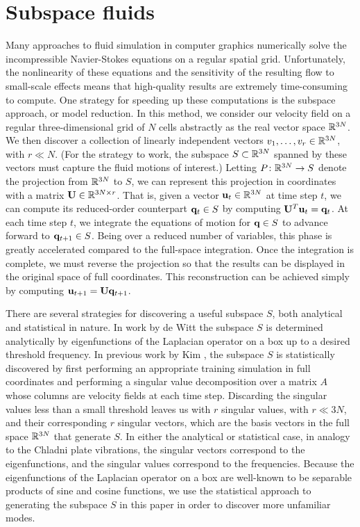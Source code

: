 \documentclass[11pt]{article}
\begin{document}
\section*{Subspace fluids}
Many approaches to fluid simulation in computer graphics numerically solve the incompressible Navier-Stokes equations on a regular spatial grid. Unfortunately, the nonlinearity of these equations and the sensitivity of the resulting flow to small-scale effects means that high-quality results are extremely time-consuming to compute. One strategy for speeding up these computations is the subspace approach, or model reduction. In this method, we consider our velocity field on a regular three-dimensional grid of $N$ cells abstractly as the real vector space $\mathbb{R}^{3N}$. We then discover a collection of linearly independent vectors $v_1, \ldots, v_r \in \mathbb{R}^{3N}$, with $r \ll N$. (For the strategy to work, the subspace $S \subset \mathbb{R}^{3N}$ spanned by these vectors must capture the fluid motions of interest.) Letting $P \colon \mathbb{R}^{3N} \rightarrow S$ denote the projection from $\mathbb{R}^{3N}$ to $S$, we can represent this projection in coordinates with a matrix $\mathbf{U} \in \mathbb{R}^{3N \times r}$. That is, given a vector $\mathbf{u}_t \in \mathbb{R}^{3N}$ at time step $t$, we can compute its reduced-order counterpart $\mathbf{q}_t \in S$ by computing $\mathbf{U}^T \mathbf{u}_t = \mathbf{q}_t$. At each time step $t$, we integrate the equations of motion for $\mathbf{q} \in S$ to advance forward to $\mathbf{q}_{t+1} \in S$. Being over a reduced number of variables, this phase is greatly accelerated compared to the full-space integration. Once the integration is complete, we must reverse the projection so that the results can be displayed in the original space of full coordinates. This reconstruction can be achieved simply by computing $\mathbf{u}_{t+1} = \mathbf{U}\mathbf{q}_{t+1}$.

There are several strategies for discovering a useful subspace $S$, both analytical and statistical in nature. In work by de Witt \cite{deWitt:2012} the subspace $S$ is determined analytically by eigenfunctions of the Laplacian operator on a box up to a desired threshold frequency. In previous work by Kim \cite{Kim2013}, the subspace $S$ is statistically discovered by first performing an appropriate training simulation in full coordinates and performing a singular value decomposition over a matrix $A$ whose columns are velocity fields at each time step. Discarding the singular values less than a small threshold leaves us with $r$ singular values, with $r \ll 3N$, and their corresponding $r$ singular vectors, which are the basis vectors in the full space $\mathbb{R}^{3N}$ that generate $S$. In either the analytical or statistical case, in analogy to the Chladni plate vibrations, the singular vectors correspond to the eigenfunctions, and the singular values correspond to the frequencies. Because the eigenfunctions of the Laplacian operator on a box are well-known to be separable products of sine and cosine functions, we use the statistical approach to generating the subspace $S$ in this paper in order to discover more unfamiliar modes.
    
\end{document}
